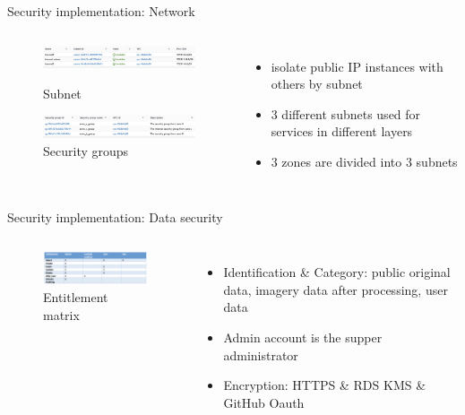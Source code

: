\documentclass[aspectratio=169]{beamer}
\begin{document}
\begin{frame}[fragile]{Security implementation: Network}

  \begin{columns}
      \begin{figure}[htbp]
        
        \centerline{\includegraphics[width=200pt]{images/subnet.png}}
        \caption{Subnet}

        \centerline{\includegraphics[width=200pt]{images/security.png}}
        \caption{Security groups}

      \end{figure}
      \begin{itemize}
        \item isolate public IP instances with others by subnet
        \pause
        \item 3 different subnets used for services in different layers
        \pause
        \item 3 zones are divided into 3 subnets
      \end{itemize}
  \end{columns}

\end{frame}


\begin{frame}[fragile]{Security implementation: Data security}

  \begin{columns}
      \begin{figure}[htbp]
        \centerline{\includegraphics[width=180pt]{images/matrix.png}}
        \caption{Entitlement matrix}
      \end{figure}
      \begin{itemize}
        \item Identification \& Category: public original data, imagery data after processing, user data
        \pause
        \item Admin account is the supper administrator
        \pause
        \item Encryption: HTTPS \& RDS KMS \& GitHub Oauth
      \end{itemize}
  \end{columns}

\end{frame}
\end{document}
